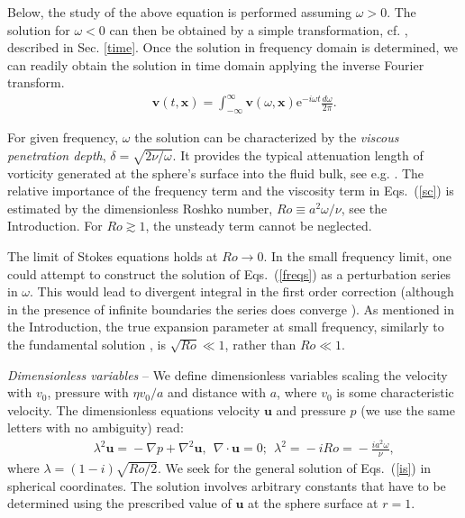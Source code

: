 \documentclass[aps,prx,twocolumn,amsmath,amssymb,amsfonts]{revtex4-2}
\newcommand{\re}{\mathrm{e}}            %
\newcommand{\red}[1]{{\color{red}#1}}
\begin{document}
Below, the study of the above equation is performed assuming $\omega>0$. The solution for $\omega<0$ can then be obtained by a simple transformation, cf. \cite{LL}, described in Sec. \ref{time}. Once the solution in frequency domain is determined, we can readily obtain the solution in time domain applying the inverse Fourier transform.  %
\begin{eqnarray}&&\!\!\!\!\!\!\!\!\!\!\!\!\!
\bm v(t, \bm x)=\int_{-\infty}^{\infty} \bm v(\omega, \bm x)  \re^{-i \omega t} \frac{d\omega}{2\pi}. \label{inverse}
\end{eqnarray}



For given frequency, $\omega$ the solution can be characterized by the \emph{viscous penetration depth}, $\delta\!=\!\sqrt{2\nu/\omega}$. It provides the typical attenuation length of vorticity generated at the sphere's surface into the fluid bulk, see e.g. \cite{LL}. The relative importance of the frequency term and the viscosity term in Eqs.~(\ref{sc}) is estimated by the dimensionless Roshko number, $Ro\equiv a^2\omega/\nu$, see the Introduction. For $Ro\gtrsim 1$, the unsteady term cannot be neglected.

The limit of Stokes equations holds at $Ro\to 0$. In the small frequency limit, one could attempt to construct the solution of Eqs.~(\ref{freqs}) as a perturbation series in $\omega$. This would lead to divergent integral in the first order correction (although in the presence of infinite boundaries the series does converge \cite{fl18}). As mentioned in the Introduction, the true expansion parameter at small frequency, similarly to the fundamental solution \cite{kim}, is $\sqrt{Ro}\ll 1$, rather than $Ro\ll 1$.

\textit{Dimensionless variables} -- We define dimensionless variables scaling the velocity with $v_0$, pressure with $\eta v_0/a$ and distance with $a$, where $v_0$ is some characteristic velocity. The dimensionless equations velocity $\bm u$ and pressure $p$ (we use the same letters with no ambiguity) read:
\begin{eqnarray}&&\!\!\!\!\!\!\!
\lambda^{2}\bm u\!=\!-\!\nabla p
\!+\! \nabla^2\bm u,\ \ \nabla\!\cdot\!\bm u\!=\!0; \ \ \lambda^2\!=\!-i Ro\!=\!- \frac{i a^2\omega}{\nu}, \label{is}
\end{eqnarray}
where $\lambda=(1-i)\sqrt{Ro/2}$. We seek for the general solution of Eqs.~(\ref{is}) in spherical coordinates. The solution involves arbitrary constants that have to be determined using the prescribed value of $\bm u$ at the sphere surface at $r\!=\!1$.
\end{document}
